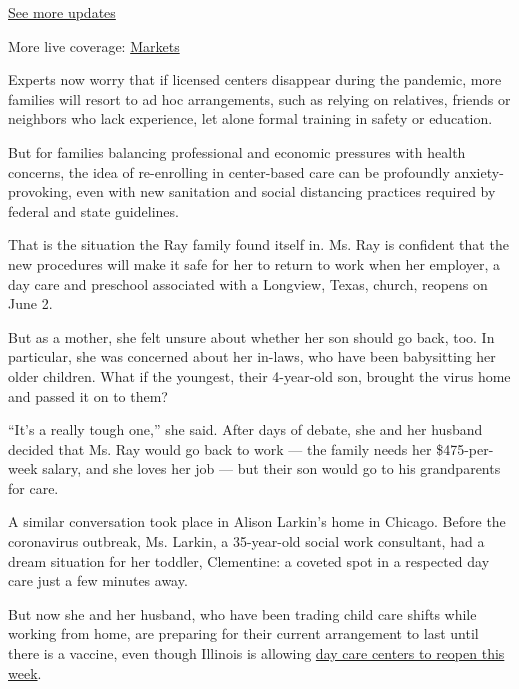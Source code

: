 \href{https://www.nytimes3xbfgragh.onion/2020/08/20/world/coronavirus-covid.html?action=click\&pgtype=Article\&state=default\&region=MAIN_CONTENT_1\&context=storylines_live_updates}{See
more updates}

More live coverage:
\href{https://www.nytimes3xbfgragh.onion/live/2020/08/20/business/stock-market-today-coronavirus?action=click\&pgtype=Article\&state=default\&region=MAIN_CONTENT_1\&context=storylines_live_updates}{Markets}

Experts now worry that if licensed centers disappear during the
pandemic, more families will resort to ad hoc arrangements, such as
relying on relatives, friends or neighbors who lack experience, let
alone formal training in safety or education.

But for families balancing professional and economic pressures with
health concerns, the idea of re-enrolling in center-based care can be
profoundly anxiety-provoking, even with new sanitation and social
distancing practices required by federal and state guidelines.

That is the situation the Ray family found itself in. Ms. Ray is
confident that the new procedures will make it safe for her to return to
work when her employer, a day care and preschool associated with a
Longview, Texas, church, reopens on June 2.

But as a mother, she felt unsure about whether her son should go back,
too. In particular, she was concerned about her in-laws, who have been
babysitting her older children. What if the youngest, their 4-year-old
son, brought the virus home and passed it on to them?

``It's a really tough one,'' she said. After days of debate, she and her
husband decided that Ms. Ray would go back to work --- the family needs
her \$475-per-week salary, and she loves her job --- but their son would
go to his grandparents for care.

A similar conversation took place in Alison Larkin's home in Chicago.
Before the coronavirus outbreak, Ms. Larkin, a 35-year-old social work
consultant, had a dream situation for her toddler, Clementine: a coveted
spot in a respected day care just a few minutes away.

But now she and her husband, who have been trading child care shifts
while working from home, are preparing for their current arrangement to
last until there is a vaccine, even though Illinois is allowing
\href{https://www.chicagotribune.com/coronavirus/ct-coronavirus-illinois-child-care-facilities-reopen-daycare-20200522-tbsreoatqfeblldhkx7lmfe3km-story.html}{day
care centers to reopen this week}.

